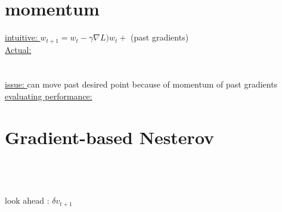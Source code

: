 \section{momentum}
\underline{intuitive: }$w_{t+1}=w_t-\gamma \nabla L)w_t+$ (past gradients)\\
\underline{Actual: }\\ \\
\\
\underline{issue: } can move past desired point because of momentum of past gradients\\
\underline{evaluating performance: } \\

\section{Gradient-based Nesterov}
\\
\\
\\
look ahead : $\delta v_{t+1}$

